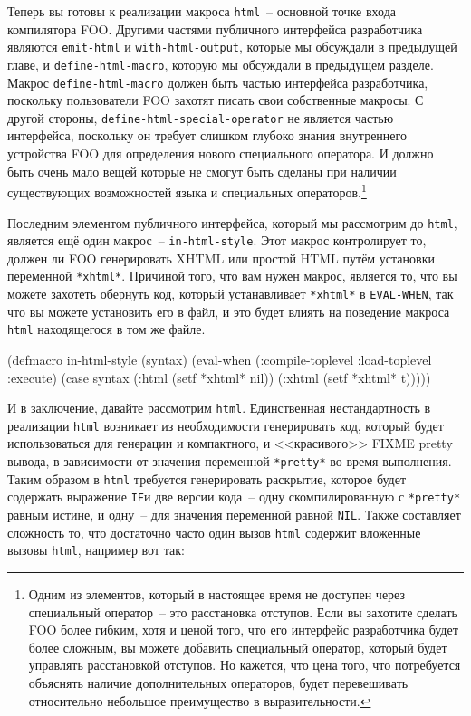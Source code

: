 Теперь вы готовы к реализации макроса \lstinline{html}~-- основной точке входа компилятора
FOO. Другими частями публичного интерфейса разработчика являются \lstinline{emit-html} и
\lstinline{with-html-output}, которые мы обсуждали в предыдущей главе, и
\lstinline{define-html-macro}, которую мы обсуждали в предыдущем разделе. Макрос
\lstinline{define-html-macro} должен быть частью интерфейса разработчика, поскольку
пользователи FOO захотят писать свои собственные макросы. С другой стороны,
\lstinline{define-html-special-operator} не является частью интерфейса, поскольку он требует
слишком глубоко знания внутреннего устройства FOO для определения нового специального
оператора. И должно быть очень мало вещей которые не смогут быть сделаны при наличии
существующих возможностей языка и специальных операторов.\footnote{Одним из элементов,
  который в настоящее время не доступен через специальный оператор~-- это расстановка
  отступов.  Если вы захотите сделать FOO более гибким, хотя и ценой того, что его
  интерфейс разработчика будет более сложным, вы можете добавить специальный оператор,
  который будет управлять расстановкой отступов.  Но кажется, что цена того, что
  потребуется объяснять наличие дополнительных операторов, будет перевешивать относительно
  небольшое преимущество в выразительности.}

Последним элементом публичного интерфейса, который мы рассмотрим до \lstinline{html}, является
ещё один макрос~-- \lstinline{in-html-style}.  Этот макрос контролирует то, должен ли FOO
генерировать XHTML или простой HTML путём установки переменной \lstinline{*xhtml*}.  Причиной
того, что вам нужен макрос, является то, что вы можете захотеть обернуть код, который
устанавливает \lstinline{*xhtml*} в \lstinline{EVAL-WHEN}, так что вы можете установить его в файл,
и это будет влиять на поведение макроса \lstinline{html} находящегося в том же файле.

\begin{myverb}
(defmacro in-html-style (syntax)
  (eval-when (:compile-toplevel :load-toplevel :execute)
    (case syntax
      (:html (setf *xhtml* nil))
      (:xhtml (setf *xhtml* t)))))
\end{myverb}

И в заключение, давайте рассмотрим \lstinline{html}.  Единственная нестандартность в реализации
\lstinline{html} возникает из необходимости генерировать код, который будет использоваться для
генерации и компактного, и <<красивого>> FIXME pretty вывода, в зависимости от значения
переменной \lstinline{*pretty*} во время выполнения.  Таким образом в \lstinline{html} требуется
генерировать раскрытие, которое будет содержать выражение \lstinline{IF}и две версии кода~--
одну скомпилированную с \lstinline{*pretty*} равным истине, и одну~-- для значения переменной
равной \lstinline{NIL}.  Также составляет сложность то, что достаточно часто один вызов
\lstinline{html} содержит вложенные вызовы \lstinline{html}, например вот так:

